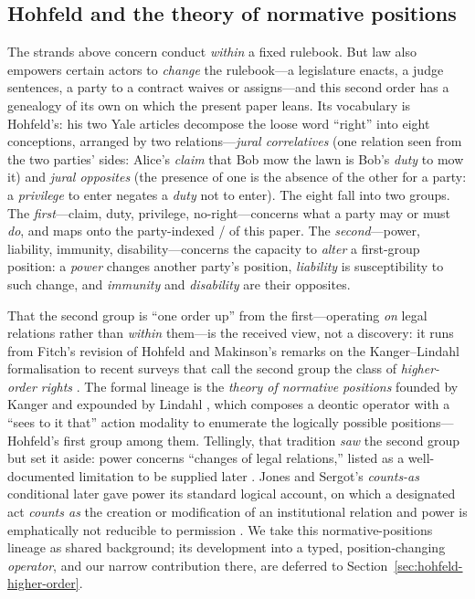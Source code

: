 \subsection{Hohfeld and the theory of normative positions}
\label{sec:normative-positions}
The strands above concern conduct \emph{within} a fixed rulebook. But law also empowers
certain actors to \emph{change} the rulebook---a legislature enacts, a judge sentences, a
party to a contract waives or assigns---and this second order has a genealogy of its own on
which the present paper leans. Its vocabulary is Hohfeld's: his two Yale articles
 decompose the loose word ``right'' into eight conceptions,
arranged by two relations---\emph{jural correlatives} (one relation seen from the two
parties' sides: Alice's \emph{claim} that Bob mow the lawn is Bob's \emph{duty} to mow it)
and \emph{jural opposites} (the presence of one is the absence of the other for a party: a
\emph{privilege} to enter negates a \emph{duty} not to enter). The eight fall into two
groups. The \emph{first}---claim, duty, privilege, no-right---concerns what a party may or
must \emph{do}, and maps onto the party-indexed \MUST{}/\MAY{} of this paper. The
\emph{second}---power, liability, immunity, disability---concerns the capacity to
\emph{alter} a first-group position: a \emph{power} changes another party's position,
\emph{liability} is susceptibility to such change, and \emph{immunity} and \emph{disability}
are their opposites.

That the second group is ``one order up'' from the first---operating \emph{on} legal
relations rather than \emph{within} them---is the received view, not a discovery: it runs
from Fitch's revision of Hohfeld  and Makinson's remarks on the
Kanger--Lindahl formalisation  to recent surveys that call the second
group the class of \emph{higher-order rights} . The formal lineage is
the \emph{theory of normative positions} founded by Kanger and expounded by Lindahl
, which composes a deontic operator with a
``sees to it that'' action modality to enumerate the logically possible positions---Hohfeld's
first group among them. Tellingly, that tradition \emph{saw} the second group but set it
aside: power concerns ``changes of legal relations,'' listed as a well-documented limitation
to be supplied later . Jones and Sergot's \emph{counts-as} conditional
later gave power its standard logical account, on which a designated act \emph{counts as} the
creation or modification of an institutional relation and power is emphatically not reducible
to permission . We take this normative-positions lineage as shared
background; its development into a typed, position-changing \emph{operator}, and our narrow
contribution there, are deferred to Section~\ref{sec:hohfeld-higher-order}.

